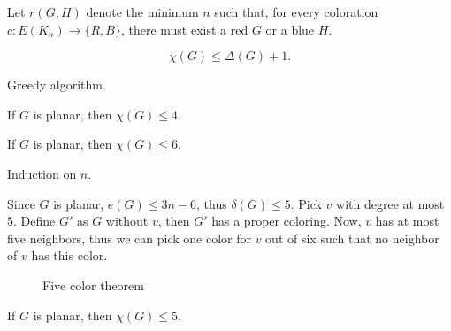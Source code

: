\begin{defn}
	Let $r(G, H)$ denote the minimum $n$ such that, for every coloration $c \colon E(K_n) \to \{R, B\}$, there must exist a red $G$ or a blue $H$.
\end{defn}

\begin{prop}
	\[
		\chi(G) \le \Delta(G) + 1.
	\]
\end{prop}

\begin{sk}
	Greedy algorithm.
\end{sk}

\begin{thm}
	If $G$ is planar, then $\chi(G) \le 4$.
\end{thm}

\begin{prop}
	If $G$ is planar, then $\chi(G) \le 6$.
\end{prop}

\begin{dem}
	Induction on $n$.

	Since $G$ is planar, $e(G) \le 3n - 6$, thus $\delta(G) \le 5$. Pick $v$ with degree at most $5$. 
	Define $G'$ as $G$ without $v$, then $G'$ has a proper coloring. Now, $v$ has at most five neighbors, thus we can pick one color for $v$ out of six such that no neighbor of $v$ has this color.
\end{dem}

\begin{figure}[ht]
    \centering
    \caption{Five color theorem}
    \label{fig:second-case-five-color-theorem}
\end{figure}

\begin{thm}
	If $G$ is planar, then $\chi(G) \le 5$.
\end{thm}

